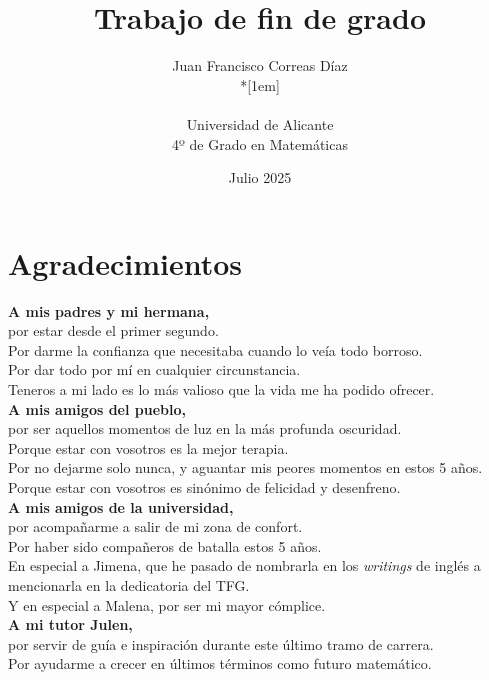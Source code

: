 \documentclass[12pt,twoside]{article}
\title{Trabajo de fin de grado}
\author{Juan Francisco Correas Díaz \\*[1em]
\begin{minipage}{0.75\textwidth}
\footnotesize \itshape
\begin{center}
Universidad de Alicante \\
4º de Grado en Matemáticas
\end{center}
\end{minipage}
}
\date{Julio 2025}
\begin{document}


\newpage


\section*{Agradecimientos}

\textbf{A mis padres y mi hermana,} \\[0.5em]
por estar desde el primer segundo. \\
Por darme la confianza que necesitaba cuando lo veía todo borroso. \\
Por dar todo por mí en cualquier circunstancia. \\
Teneros a mi lado es lo más valioso que la vida me ha podido ofrecer. \\[1em]

\textbf{A mis amigos del pueblo,} \\[0.5em]
por ser aquellos momentos de luz en la más profunda oscuridad. \\
Porque estar con vosotros es la mejor terapia. \\
Por no dejarme solo nunca, y aguantar mis peores momentos en estos 5 años. \\
Porque estar con vosotros es sinónimo de felicidad y desenfreno. \\[1em]

\textbf{A mis amigos de la universidad,} \\[0.5em]
por acompañarme a salir de mi zona de confort. \\
Por haber sido compañeros de batalla estos 5 años. \\ 
En especial a Jimena, que he pasado de nombrarla en los \textit{writings} de inglés a mencionarla en la dedicatoria del TFG. \\
Y en especial a Malena, por ser mi mayor cómplice. \\[1em]

\textbf{A mi tutor Julen,} \\[0.5em]
por servir de guía e inspiración durante este último tramo de carrera. \\
Por ayudarme a crecer en últimos términos como futuro matemático. \\[1em]
\end{document}
